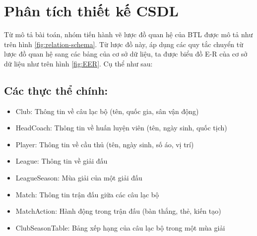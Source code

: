 \documentclass[../BTL.tex]{subfiles}
\begin{document}
\section{Phân tích thiết kế CSDL}
Từ mô tả bài toán, nhóm tiến hành vẽ lược đồ quan hệ của BTL được mô tả như trên hình \ref{fig:relation-schema}. Từ lược đồ này, áp dụng các quy tắc chuyển từ lược đồ quan hệ sang các bảng của cơ sở dữ liệu, ta được biểu đồ E-R của cơ sở dữ liệu như trên hình \ref{fig:EER}. Cụ thể như sau:

\subsection{Các thực thể chính:}
\begin{itemize}
    \item Club: Thông tin về câu lạc bộ (tên, quốc gia, sân vận động)
    \item HeadCoach: Thông tin về huấn luyện viên (tên, ngày sinh, quốc tịch)
    \item Player: Thông tin về cầu thủ (tên, ngày sinh, số áo, vị trí)
    \item League: Thông tin về giải đấu
    \item LeagueSeason: Mùa giải của một giải đấu
    \item Match: Thông tin trận đấu giữa các câu lạc bộ
    \item MatchAction: Hành động trong trận đấu (bàn thắng, thẻ, kiến tạo)
    \item ClubSeasonTable: Bảng xếp hạng của câu lạc bộ trong một mùa giải
\end{itemize}
\end{document}
